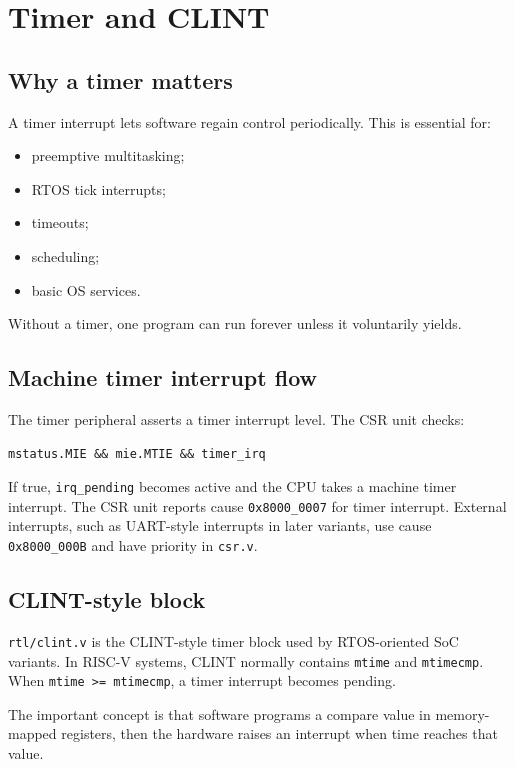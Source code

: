 \section{Timer and CLINT}

\subsection{Why a timer matters}

A timer interrupt lets software regain control periodically. This is essential for:

\begin{itemize}
\item preemptive multitasking;
\item RTOS tick interrupts;
\item timeouts;
\item scheduling;
\item basic OS services.
\end{itemize}
Without a timer, one program can run forever unless it voluntarily yields.

\subsection{Machine timer interrupt flow}

The timer peripheral asserts a timer interrupt level. The CSR unit checks:

\begin{lstlisting}[language={}]
mstatus.MIE && mie.MTIE && timer_irq
\end{lstlisting}

If true, \texttt{irq\_pending} becomes active and the CPU takes a machine timer interrupt. The CSR unit reports cause \texttt{0x8000\_0007} for timer interrupt. External interrupts, such as UART-style interrupts in later variants, use cause \texttt{0x8000\_000B} and have priority in \texttt{csr.v}.

\subsection{CLINT-style block}

\texttt{rtl/clint.v} is the CLINT-style timer block used by RTOS-oriented SoC variants. In RISC-V systems, CLINT normally contains \texttt{mtime} and \texttt{mtimecmp}. When \texttt{mtime >= mtimecmp}, a timer interrupt becomes pending.

The important concept is that software programs a compare value in memory-mapped registers, then the hardware raises an interrupt when time reaches that value.

\bigskip
